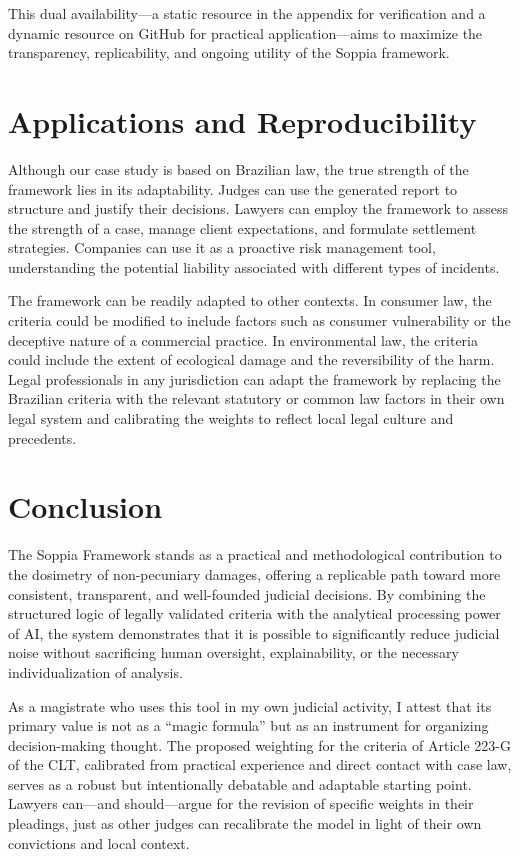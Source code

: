 \documentclass[11pt,a4paper]{article}
\begin{document}
This dual availability---a static resource in the appendix for verification and a dynamic resource on GitHub for practical application---aims to maximize the transparency, replicability, and ongoing utility of the Soppia framework.

\section{Applications and Reproducibility}

Although our case study is based on Brazilian law, the true strength of the framework lies in its adaptability. Judges can use the generated report to structure and justify their decisions. Lawyers can employ the framework to assess the strength of a case, manage client expectations, and formulate settlement strategies. Companies can use it as a proactive risk management tool, understanding the potential liability associated with different types of incidents.

The framework can be readily adapted to other contexts. In consumer law, the criteria could be modified to include factors such as consumer vulnerability or the deceptive nature of a commercial practice. In environmental law, the criteria could include the extent of ecological damage and the reversibility of the harm. Legal professionals in any jurisdiction can adapt the framework by replacing the Brazilian criteria with the relevant statutory or common law factors in their own legal system and calibrating the weights to reflect local legal culture and precedents.

\section{Conclusion}

The Soppia Framework stands as a practical and methodological contribution to the dosimetry of non-pecuniary damages, offering a replicable path toward more consistent, transparent, and well-founded judicial decisions. By combining the structured logic of legally validated criteria with the analytical processing power of AI, the system demonstrates that it is possible to significantly reduce judicial noise without sacrificing human oversight, explainability, or the necessary individualization of analysis.

As a magistrate who uses this tool in my own judicial activity, I attest that its primary value is not as a ``magic formula'' but as an instrument for organizing decision-making thought. The proposed weighting for the criteria of Article 223-G of the CLT, calibrated from practical experience and direct contact with case law, serves as a robust but intentionally debatable and adaptable starting point. Lawyers can---and should---argue for the revision of specific weights in their pleadings, just as other judges can recalibrate the model in light of their own convictions and local context.
\end{document}
